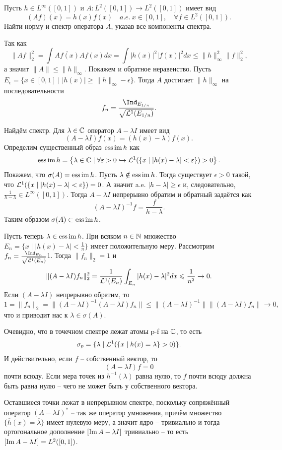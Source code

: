 \begin{task}[T10]
    Пусть $h \in L^\infty([0, 1])$ и $A\colon L^2([0, 1]) \to L^2([0, 1])$ имеет вид
    \[
        (Af)(x) = h(x)f(x) \quad a.e.\  x \in [0, 1], \quad \forall f \in L^2([0, 1]).
    \]
    Найти норму и спектр оператора $A$, указав все компоненты спектра.
\end{task}
\begin{solution}
    Так как
    \[
        \|Af\|_2^2 = \int \overline{Af(x)}Af(x)dx = \int |h(x)|^2|f(x)|^2 dx \leq \|h\|_\infty^2 \|f\|_2^2,
    \]
    а значит $\|A\| \leq \|h\|_\infty$.
    Покажем и обратное неравенство.
    Пусть $E_\epsilon = \{x \in [0, 1] \mid |h(x)| \geq \|h\|_\infty - \epsilon\}$.
    Тогда $A$ достигает $\|h\|_\infty$ на последовательности \[f_n = \frac{\Ind_{E_{1/n}}}{\sqrt{\LL^1(E_{1/n})}}.\]

    Найдём спектр.
    Для $\lambda \in \mathbb{C}$ оператор $A - \lambda I$ имеет вид
    \[
        (A - \lambda I)f(x) = (h(x) - \lambda)f(x).
    \]
    Определим существенный образ $\operatorname*{ess\,im} h$ как 
    \[
        \operatorname*{ess\,im} h = \left\{\lambda \in \mathbb{C} \mid \forall \varepsilon > 0 \hookrightarrow \mathcal{L}^1(\{x \mid |h(x) - \lambda| < \varepsilon\}) > 0\right\}.
    \]
    Покажем, что $\sigma(A) = \operatorname*{ess\,im} h$.
    Пусть $\lambda \notin \operatorname*{ess\,im} h$.
    Тогда существует $\epsilon > 0$ такой, что $\mathcal{L}^1(\{x \mid |h(x) - \lambda| < \varepsilon\}) = 0$.
    А значит a.e. $|h - \lambda| \geq \epsilon$ и, следовательно, $\frac{1}{h - \lambda} \in L^\infty([0, 1])$. Тогда $A - \lambda I$ непрерывно обратим и обратный задаётся как 
    \[
        (A - \lambda I)^{-1}f = \frac{f}{h - \lambda}.
    \]
    Таким образом $\sigma(A) \subset \operatorname*{ess\,im} h$.

    Пусть теперь $\lambda \in \operatorname*{ess\,im} h$.
    При всяком $n \in \mathbb{N}$ множество $E_n = \{x \mid |h(x) - \lambda | < \frac{1}{n}\}$ имеет положительную меру.
    Рассмотрим $f_n = \frac{\Ind_{E_n}}{\sqrt{\LL^1(E_n)}}$1.
    Тогда $\|f_n\|_2 = 1$ и
    \[
        \|(A - \lambda I)f_n\|_2^2 = \frac{1}{\mathcal{L}^1(E_n)}\int_{E_n}|h(x) - \lambda|^2 dx \leqslant \frac{1}{n^2} \rightarrow 0.
    \]
    Если $(A - \lambda I)$ непрерывно обратим, то 
    \[
        1 = \|f_n\|_2 = \|(A - \lambda I)^{-1}(A - \lambda I)f_n\| \leq \|(A - \lambda I)^{-1}\|\|(A - \lambda I)f_n\| \rightarrow 0,
    \]
    что и приводит нас к $\lambda \in \sigma(A)$.

    Очевидно, что в точечном спектре лежат атомы p-f на $\mathbb{C}$, то есть
    \[
        \sigma_p = \{\lambda \mid \mathcal{L}^1(\{x \mid h(x) = \lambda\} > 0)\}.
    \]
    И действительно, если $f$ -- собственный вектор, то
    \[
        (A - \lambda I)f = 0
    \]
    почти всюду.
    Если мера точек из $h^{-1}(\lambda)$ равна нулю, то $f$ почти всюду должна быть равна нулю -- чего не может быть у собственного вектора.

    Оставшиеся точки лежат в непрерывном спектре, поскольку сопряжённый оператор $(A - \lambda I)^*$ -- так же оператор умножения, причём множество $\{\overline{h}(x) = \overline{\lambda}\}$ имеет нулевую меру, а значит ядро -- тривиально и тогда ортогональное дополнение $[\operatorname{Im} A - \lambda I]$ тривиально -- то есть $[\operatorname{Im} A - \lambda I] = L^2([0, 1])$.
\end{solution}